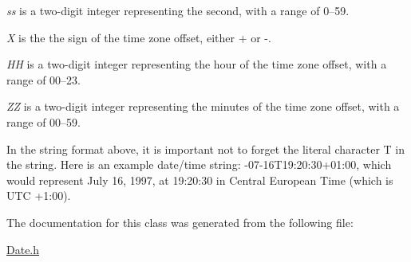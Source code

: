 \begin{DoxyItemize}
\item {\itshape ss} is a two-\/digit integer representing the second, with a range of 0--59.\end{DoxyItemize}
\begin{DoxyItemize}
\item {\itshape X} is the the sign of the time zone offset, either {\ttfamily +} or {\ttfamily -\/}.\end{DoxyItemize}
\begin{DoxyItemize}
\item {\itshape HH} is a two-\/digit integer representing the hour of the time zone offset, with a range of 00--23.\end{DoxyItemize}
\begin{DoxyItemize}
\item {\itshape ZZ} is a two-\/digit integer representing the minutes of the time zone offset, with a range of 00--59.\end{DoxyItemize}
In the string format above, it is important not to forget the literal character {\ttfamily T} in the string. Here is an example date/time string\+: {-\/07-\/16\+T19\+:20\+:30+01\+:00}, which would represent July 16, 1997, at 19\+:20\+:30 in Central European Time (which is U\+TC +1\+:00). 

The documentation for this class was generated from the following file\+:\begin{DoxyCompactItemize}
\item 
\hyperlink{_date_8h}{Date.\+h}\end{DoxyCompactItemize}
